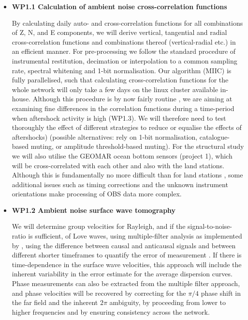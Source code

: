 \documentclass[11pt]{article}
\begin{document}
\begin{itemize}
\item
{\bf WP1.1 Calculation of ambient noise cross-correlation functions}

By calculating daily auto- and cross-correlation functions for all combinations of Z, N, and E components, we will derive vertical, tangential and radial cross-correlation functions and combinations thereof (vertical-radial etc.) in an efficient manner. For pre-processing we follow the standard procedure of instrumental restitution, decimation or interpolation to a common sampling rate, spectral whitening and 1-bit normalisation. Our algorithm (MIIC) is fully parallelised, such that calculating cross-correlation functions for the whole network will only take a few days on the linux cluster available in-house. Although this procedure is by now fairly routine \citep{Lin2008,Jaxybulatov2014}, we are aiming at examining fine differences in the correlation functions during a time-period when aftershock activity is high (WP1.3). We will therefore need to test thoroughly the effect of different strategies to reduce or equalise the effects of aftershocks) (possible alternatives: rely on 1-bit normalisation, catalogue-based muting,  or amplitude threshold-based muting).  For the structural study we will also utilise the GEOMAR ocean bottom sensors (project 1), which will be cross-correlated with each other and also with the land stations. Although this is fundamentally no more difficult than for land stations \citep{Harmon2012}, some additional issues such as timing corrections and the unknown instrument orientations make processing of OBS data more complex.

\item
{\bf WP1.2 Ambient noise surface wave tomography}

We will determine group velocities for Rayleigh, and if the signal-to-noise-ratio is sufficient, of Love waves, using multiple-filter analysis as implemented by \citet{herrmann02}, using the difference between causal and anticausal signals and between different shorter timeframes to quantify the error of measurement \citep[see][]{bensen07}. If there is time-dependence in the surface wave velocities, this approach will include the inherent variability in the error estimate for the average dispersion curves. Phase measurements can also be extracted from the multiple filter approach, and phase velocities will be recovered by correcting for the $\pi/4$ phase shift in the far field and the inherent $2\pi$ ambiguity, by proceeding from lower to higher frequencies and by ensuring consistency across the network. 


\end{itemize}
\end{document}
